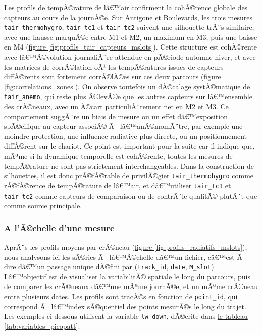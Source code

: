 \documentclass{article}
\begin{document}
Les profils de tempÃ©rature de lâ€™air confirment la cohÃ©rence globale des capteurs au cours de la journÃ©e. Sur Antigone et Boulevards, les trois mesures \texttt{tair\_thermohygro}, \texttt{tair\_tc1} et \texttt{tair\_tc2} suivent une silhouette trÃ¨s similaire, avec une hausse marquÃ©e entre M1 et M2, un maximum en M3, puis une baisse en M4 (\hyperref[fig:profils_tair_capteurs_mslots]{figure \ref{fig:profils_tair_capteurs_mslots}}). Cette structure est cohÃ©rente avec lâ€™Ã©volution journaliÃ¨re attendue en pÃ©riode automne hiver, et avec les matrices de corrÃ©lation oÃ¹ les tempÃ©ratures issues de capteurs diffÃ©rents sont fortement corrÃ©lÃ©es sur ces deux parcours (\hyperref[fig:correlations_zones]{figure \ref{fig:correlations_zones}}).
On observe toutefois un dÃ©calage systÃ©matique de \texttt{tair\_anemo}, qui reste plus Ã©levÃ©e que les autres capteurs sur lâ€™ensemble des crÃ©neaux, avec un Ã©cart particuliÃ¨rement net en M2 et M3. Ce comportement suggÃ¨re un biais de mesure ou un effet dâ€™exposition spÃ©cifique au capteur associÃ© Ã  lâ€™anÃ©momÃ¨tre, par exemple une moindre protection, une influence radiative plus directe, ou un positionnement diffÃ©rent sur le chariot. Ce point est important pour la suite car il indique que, mÃªme si la dynamique temporelle est cohÃ©rente, toutes les mesures de tempÃ©rature ne sont pas strictement interchangeables. Dans la construction de silhouettes, il est donc prÃ©fÃ©rable de privilÃ©gier \texttt{tair\_thermohygro} comme rÃ©fÃ©rence de tempÃ©rature de lâ€™air, et dâ€™utiliser \texttt{tair\_tc1} et \texttt{tair\_tc2} comme capteurs de comparaison ou de contrÃ´le qualitÃ© plutÃ´t que comme source principale.

\subsubsection{A l'Ã©chelle d'une mesure}

AprÃ¨s les profils moyens par crÃ©neau (\hyperref[fig:profils_radiatifs_mslots]{figure \ref{fig:profils_radiatifs_mslots}}), nous analysons ici les sÃ©ries Ã  lâ€™Ã©chelle dâ€™un fichier, câ€™est-Ã -dire dâ€™un passage unique dÃ©fini par (\texttt{track\_id}, \texttt{date}, \texttt{M\_slot}). Lâ€™objectif est de visualiser la variabilitÃ© spatiale le long du parcours, puis de comparer les crÃ©neaux dâ€™une mÃªme journÃ©e, et un mÃªme crÃ©neau entre plusieurs dates. Les profils sont tracÃ©s en fonction de \texttt{point\_id}, qui correspond Ã  lâ€™index sÃ©quentiel des points mesurÃ©s le long du trajet. Les exemples ci-dessous utilisent la variable \texttt{lw\_down}, dÃ©crite dans \hyperref[tab:variables_picopatt]{le tableau \ref{tab:variables_picopatt}}.
\end{document}
